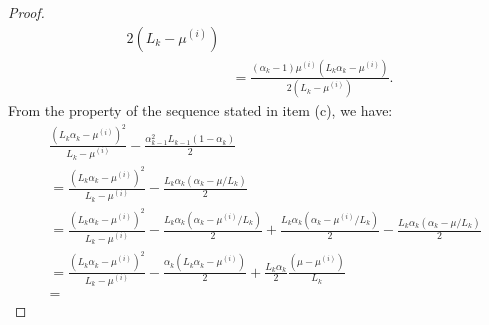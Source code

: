 \documentclass[12pt]{article}
\begin{document}
\begin{proof}
{\begin{align*}
                {2\left(L_k - \mu^{(i)}\right)}
                \\
                &= \frac{(\alpha_k - 1)\mu^{(i)}\left(L_k\alpha_k - \mu^{(i)}\right)}
                {2\left(L_k - \mu^{(i)}\right)}. 
            \end{align*}
            }
            From the property of the sequence stated in item (c), we have: 
            \begin{align*}
                &\frac{\left(
                    L_k\alpha_k - \mu^{(i)}
                \right)^2}{L_k - \mu^{(i)}} 
                -
                \frac{\alpha_{k - 1}^2L_{k - 1}(1 - \alpha_k)}{2} 
                \\
                &= 
                \frac{\left(
                    L_k\alpha_k - \mu^{(i)}
                \right)^2}{L_k - \mu^{(i)}} 
                -
                \frac{L_k\alpha_k(\alpha_k - \mu/L_k)}{2} 
                \\
                &=
                \frac{\left(
                    L_k\alpha_k - \mu^{(i)}
                \right)^2}{L_k - \mu^{(i)}} 
                - \frac{L_k\alpha_k(\alpha_k - \mu^{(i)}/L_k)}{2}
                + \frac{L_k\alpha_k(\alpha_k - \mu^{(i)}/L_k)}{2} 
                - \frac{L_k\alpha_k(\alpha_k - \mu/L_k)}{2} 
                \\
                &= 
                \frac{\left(
                    L_k\alpha_k - \mu^{(i)}
                \right)^2}{L_k - \mu^{(i)}} 
                - \frac{\alpha_k(L_k\alpha_k - \mu^{(i)})}{2}
                + \frac{L_k\alpha_k}{2}
                \frac{\left(
                    \mu - \mu^{(i)}
                \right)}{L_k}
                \\
                &= 
            \end{align*}
        \end{proof}


    



\end{document}
